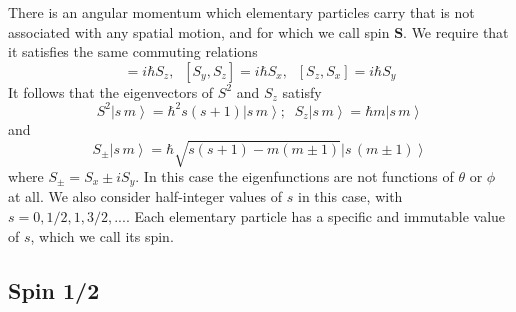 \documentclass[12pt, a4paper, oneside, openright, titlepage]{book}
\newcommand{\ket}[1]{\left\vert#1\right\rangle}
\begin{document}
There is an  angular momentum which elementary particles carry that is not associated with any spatial motion, and for which we call spin $\mathbf{S}$. We require that it satisfies the same commuting relations \begin{equation*}
    [S_x,S_y] = i\hbar S_z,\;\;[S_y,S_z] = i\hbar S_x,\;\;[S_z,S_x] = i\hbar S_y
\end{equation*}
It follows that the eigenvectors of $S^2$ and $S_z$ satisfy \begin{equation*}
    S^2\ket{s\,m} = \hbar^2s(s+1)\ket{s\,m};\;\;S_z\ket{s\,m} = \hbar m\ket{s\,m}
\end{equation*}
and \begin{equation*}
    S_{\pm}\ket{s\,m} = \hbar\sqrt{s(s+1)-m(m\pm 1)}\ket{s\,(m\pm1)}
\end{equation*}
where $S_{\pm} = S_x \pm iS_y$. In this case the eigenfunctions are not functions of $\theta$ or $\phi$ at all. We also consider half-integer values of $s$ in this case, with $s = 0,1/2,1,3/2,...$. Each elementary particle has a specific and immutable value of $s$, which we call its spin.

\subsection{Spin 1/2}
\end{document}
